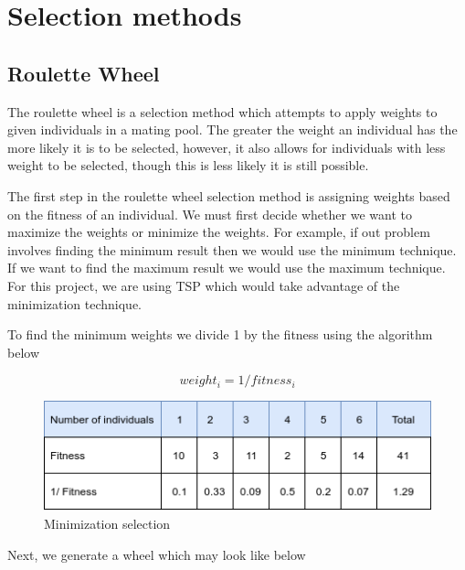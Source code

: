 \section{Selection methods}

\subsection{Roulette Wheel}

The roulette wheel is a selection method which attempts to apply weights to given individuals in a mating pool. The greater the weight an individual has the more likely it is to be selected, however, it also allows for individuals with less weight to be selected, though this is less likely it is still possible.

The first step in the roulette wheel selection method is assigning weights based on the fitness of an individual. We must first decide whether we want to maximize the weights or minimize the weights. For example, if out problem involves finding the minimum result then we would use the minimum technique. If we want to find the maximum result we would use the maximum technique. For this project, we are using TSP which would take advantage of the minimization technique. 

To find the minimum weights we divide 1 by the fitness using the algorithm below

\begin{equation}\label{eq:original-formula}
weight_i = 1 / fitness_i
\end{equation}

\begin{figure}[h!]
\vspace{-5pt}
\centering
\includegraphics[width=1.0\textwidth]{images/roulette-wheel-1.png}
\caption{\label{fig:3col_graph}Minimization selection}
\end{figure}

Next, we generate a wheel which may look like below

